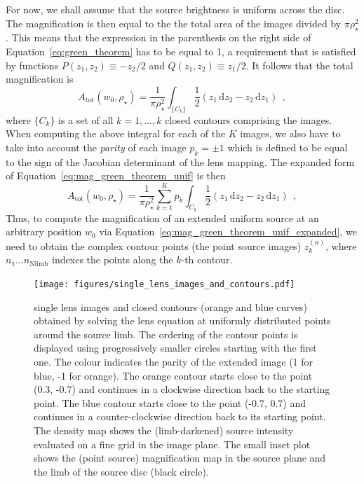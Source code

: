 \documentclass[12pt,dvipsnames]{report}
\newcommand{\ud}{\,\mathrm{d}}
\newcommand{\hquad}{~~}
\begin{document}
For now, we shall assume that the source brightness is uniform across the disc. 
The magnification is then  equal to the the total area of the images
divided by $\pi\rho_\star^2$. This means that the expression in the parenthesis
on the right side of Equation~\ref{eq:green_theorem} has to be equal to 1, a requirement that is 
satisfied by functions $P(z_1, z_2)\equiv -z_2/2$ and $Q(z_1, z_2)\equiv
    z_1/2$. It follows that the total magnification is
\begin{equation}
    A_\mathrm{tot}\left(w_0, \rho_{\star}\right)=\frac{1}{\pi \rho_{\star}^{2}}
    \int_{\{C_k\}} \frac{1}{2}(z_{1} \ud z_{2}-z_{2} \ud z_{1})
    \hquad ,
    \label{eq:mag_green_theorem_unif}
\end{equation}
where $\{C_k\}$ is a set of all $k=1,\dots,k$ closed contours comprising the images.
When computing the  above integral for each of the $K$ images, we also have to
take into account the \emph{parity} of each image $p_k=\pm 1$ which is defined to
be equal to the sign of the Jacobian determinant of the lens mapping. The expanded
form of Equation~\ref{eq:mag_green_theorem_unif} is then
\begin{equation}
    A_\mathrm{tot}\left(w_0, \rho_{\star}\right)=\frac{1}{\pi \rho_{\star}^{2}}
    \sum_{k=1}^Kp_k\int_{C_k} \frac{1}{2}(z_{1} \ud z_{2}-z_{2} \ud z_{1})
    \hquad ,
    \label{eq:mag_green_theorem_unif_expanded}
\end{equation}
Thus, to compute the magnification of an extended uniform source at an arbitrary 
position $w_0$ via Equation~\ref{eq:mag_green_theorem_unif_expanded}, we need
to obtain the complex contour points (the point source images) $z_k^{(n)}$, where $n_1\dots
    n_\mathrm{Nlimb}$ indexes the points along the $k$-th contour. 

\begin{figure}[t]
    \begin{centering}
        \texttt{[image: figures/single\_lens\_images\_and\_contours.pdf]}
        \caption{
            single lens images and closed contours (orange and blue curves) obtained by 
            solving the lens equation at uniformly distributed points around the source limb.
            The ordering of the contour points is displayed using progressively smaller 
            circles starting with the first one. The colour indicates
            the parity of the extended image (1 for blue, -1 for orange).
            The orange contour starts close to the point (0.3, -0.7) and continues in 
            a clockwise direction back to the starting point. The blue contour starts 
            close to the point (-0.7, 0.7) and continues in a counter-clockwise direction 
            back to its starting point. The density map shows the (limb-darkened) source
            intensity evaluated on a fine grid in the image plane. The small
            inset plot shows the (point source) magnification map in the source plane
            and the limb of the source disc (black circle).
        }
        \label{fig:single_lens_images_and_contours}
    \end{centering}
\end{figure}
\end{document}
